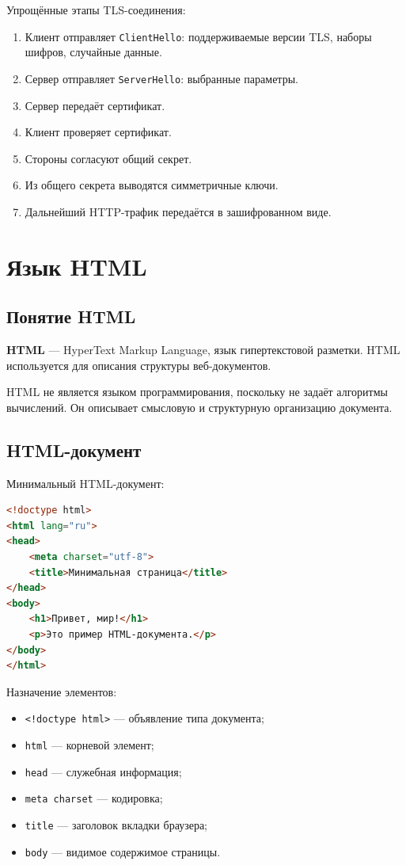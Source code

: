 \documentclass[12pt,a4paper]{article}
\begin{document}
Упрощённые этапы TLS-соединения:
\begin{enumerate}
    \item Клиент отправляет \texttt{ClientHello}: поддерживаемые версии TLS, наборы шифров, случайные данные.
    \item Сервер отправляет \texttt{ServerHello}: выбранные параметры.
    \item Сервер передаёт сертификат.
    \item Клиент проверяет сертификат.
    \item Стороны согласуют общий секрет.
    \item Из общего секрета выводятся симметричные ключи.
    \item Дальнейший HTTP-трафик передаётся в зашифрованном виде.
\end{enumerate}

\section{Язык HTML}

\subsection{Понятие HTML}

\textbf{HTML} --- HyperText Markup Language, язык гипертекстовой разметки. HTML используется для описания структуры веб-документов.

HTML не является языком программирования, поскольку не задаёт алгоритмы вычислений. Он описывает смысловую и структурную организацию документа.

\subsection{HTML-документ}

Минимальный HTML-документ:
\begin{lstlisting}[language=HTML]
<!doctype html>
<html lang="ru">
<head>
    <meta charset="utf-8">
    <title>Минимальная страница</title>
</head>
<body>
    <h1>Привет, мир!</h1>
    <p>Это пример HTML-документа.</p>
</body>
</html>
\end{lstlisting}

Назначение элементов:
\begin{itemize}
    \item \texttt{<!doctype html>} --- объявление типа документа;
    \item \texttt{html} --- корневой элемент;
    \item \texttt{head} --- служебная информация;
    \item \texttt{meta charset} --- кодировка;
    \item \texttt{title} --- заголовок вкладки браузера;
    \item \texttt{body} --- видимое содержимое страницы.
\end{itemize}
\end{document}
